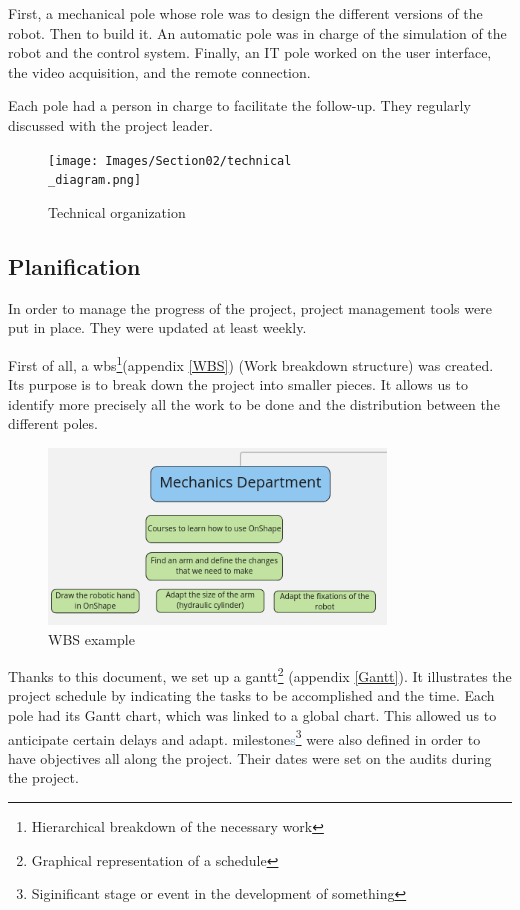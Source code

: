 \bigbreak
First, a mechanical pole whose role was to design the different versions of the robot. Then to build it. An automatic pole was in charge of the simulation of the robot and the control system. Finally, an IT pole worked on the user interface, the video acquisition, and the remote connection.

\bigbreak
Each pole had a person in charge to facilitate the follow-up. They regularly discussed with the project leader.

\begin{figure}[ht]
    \centering
    \texttt{[image: Images/Section02/technical\\\_diagram.png]}
    \caption{Technical organization}
    \label{fig:techOrga}
\end{figure}
\FloatBarrier

\subsection{Planification}

In order to manage the progress of the project, project management tools were put in place. They were updated at least weekly.

\bigbreak
First of all, a \gls{wbs}\footnote{Hierarchical breakdown of the necessary work}(appendix \ref{WBS}) (Work breakdown structure) was created. Its purpose is to break down the project into smaller pieces. It allows us to identify more precisely all the work to be done and the distribution between the different poles. 

\begin{figure}[ht]
    \centering
    \includegraphics[width=0.8\textwidth]{Images/Section02/wbs.png}
    \caption{WBS example}
    \label{fig:WBSextract}
\end{figure}
\FloatBarrier

\bigbreak
Thanks to this document, we set up a \gls{gantt}\footnote{Graphical representation of a schedule} (appendix \ref{Gantt}). It illustrates the project schedule by indicating the tasks to be accomplished and the time. Each pole had its Gantt chart, which was linked to a global chart. This allowed us to anticipate certain delays and adapt. \Gls{milestone}\textcolor{SteelBlue}{s}\footnote{Siginificant stage or event in the development of something} were also defined in order to have objectives all along the project. Their dates were set on the audits during the project.

